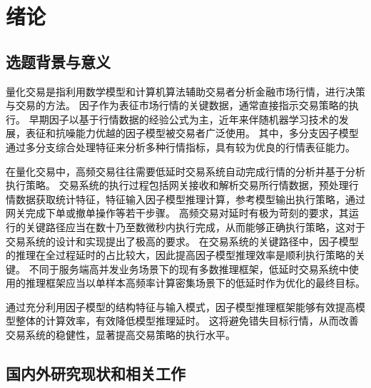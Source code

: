 
\chapter{绪论}
\label{cha:introduction}
\section{选题背景与意义}
\label{sec:background}
量化交易是指利用数学模型和计算机算法辅助交易者分析金融市场行情，进行决策与交易的方法。
因子作为表征市场行情的关键数据，通常直接指示交易策略的执行。
早期因子以基于行情数据的经验公式为主，近年来伴随机器学习技术的发展，表征和抗噪能力优越的因子模型被交易者广泛使用。
其中，多分支因子模型通过多分支综合处理特征来分析多种行情指标，具有较为优良的行情表征能力。

在量化交易中，高频交易往往需要低延时交易系统自动完成行情的分析并基于分析执行策略。
交易系统的执行过程包括网关接收和解析交易所行情数据，预处理行情数据获取统计特征，特征输入因子模型推理计算，参考模型输出执行策略，通过网关完成下单或撤单操作等若干步骤。
高频交易对延时有极为苛刻的要求，其运行的关键路径应当在数十乃至数微秒内执行完成，从而能够正确执行策略，这对于交易系统的设计和实现提出了极高的要求。
在交易系统的关键路径中，因子模型的推理在全过程延时的占比较大，因此提高因子模型推理效率是顺利执行策略的关键。
不同于服务端高并发业务场景下的现有多数推理框架，低延时交易系统中使用的推理框架应当以单样本高频率计算密集场景下的低延时作为优化的最终目标。

通过充分利用因子模型的结构特征与输入模式，因子模型推理框架能够有效提高模型整体的计算效率，有效降低模型推理延时。
这将避免错失目标行情，从而改善交易系统的稳健性，显著提高交易策略的执行水平。

\section{国内外研究现状和相关工作}
\label{sec:related_work}

